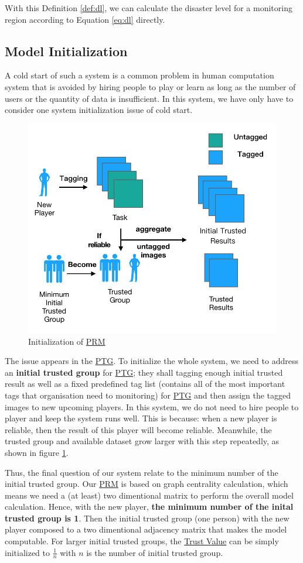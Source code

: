 With this Definition \ref{def:dl}, we can calculate the disaster level for a monitoring region 
according to Equation \ref{eq:dl} directly.

\subsection{Model Initialization}
\label{chapter:modelinit}

A cold start of such a system is a common problem in human computation system that 
is avoided by hiring people to play or learn as long as 
the number of users or the quantity of data is insufficient.
In this system, we have only have to consider one system initialization issue of cold start.

\begin{figure}[htp]
\centering
\includegraphics[width=0.5\columnwidth]{figures/coldstart2}
\caption{Initialization of \hyperref[idx:prm]{PRM}}
\label{fig:cold}
\end{figure}

The issue appears in the \hyperref[idx:ptg]{PTG}. 
To initialize the whole system, we need to address an \textbf{initial trusted group} for \hyperref[idx:ptg]{PTG}; 
they shall tagging enough initial trusted result as well as a fixed predefined tag list 
(contains all of the most important tags that organisation need to monitoring)
for \hyperref[idx:ptg]{PTG} and then assign the tagged images to new upcoming players. 
In this system, we do not need to hire people to player and keep the system runs well. This is because: 
when a new player is reliable, then the result of this player will become reliable. 
Meanwhile, the trusted group and available dataset grow larger with this step repeatedly, 
as shown in figure \ref{fig:cold}.

Thus, the final question of our system relate to the minimum number of the initial trusted group.
Our \hyperref[idx:prm]{PRM} is based on graph centrality calculation, which means we need a (at least) two dimentional matrix
to perform the overall model calculation. Hence, with the new player, \textbf{the minimum number of the inital trusted group is 1}.
Then the initial trusted group (one person) with the new player composed to a two dimentional adjacency matrix that makes the model
computable. For larger initial trusted groups, the \hyperref[def:tv]{Trust Value} can be simply initialized to $\frac{1}{n}$ with $n$ is the number of initial trusted group.